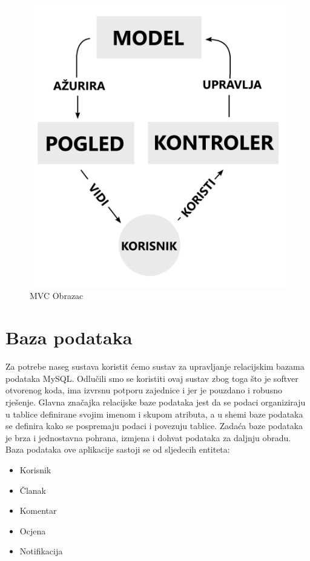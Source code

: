 		\begin{figure}[H]
			\includegraphics[scale=0.2]{slike/MVCObrazac.PNG}
			\centering
			\caption{MVC Obrazac}
			\label{fig:mvc_obrazac}
		\end{figure}

		\eject

				
		\section{Baza podataka}
			
			Za potrebe naseg sustava koristit ćemo sustav za upravljanje relacijskim bazama podataka MySQL.
   			Odlučili smo se koristiti ovaj sustav zbog toga što je softver otvorenog koda, ima izvrsnu potporu zajednice i jer je pouzdano i robusno rješenje.
			Glavna značajka relacijske baze podataka jest da se podaci organiziraju u tablice definirane svojim imenom i skupom atributa, a u shemi baze podataka se definira kako se 				pospremaju podaci i povezuju tablice.
   			Zadaća baze podataka je brza i jednostavna pohrana, izmjena i dohvat podataka za daljnju obradu.
			Baza podataka ove aplikacije sastoji se od sljedecih entiteta: 
			\begin{itemize}
				\item Korisnik
				\item Članak
				\item Komentar
				\item Ocjena
				\item Notifikacija
			  \end{itemize}
		

